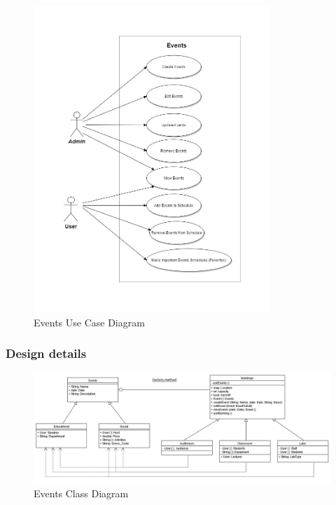 \documentclass{article}
\begin{document}
    \begin{figure}[h!]
        \includegraphics[width=0.8\textwidth]{Events/Images/EventUC.jpg}
        \caption{Events Use Case Diagram}
    \end{figure}
 
\clearpage

\subsubsection{Design details}
   
    \begin{figure}[h!]
      \includegraphics[width=\textwidth]{Events/Images/ClassDiagramEvents.png}
      \caption{Events Class Diagram}
    \end{figure}
    
\end{document}

